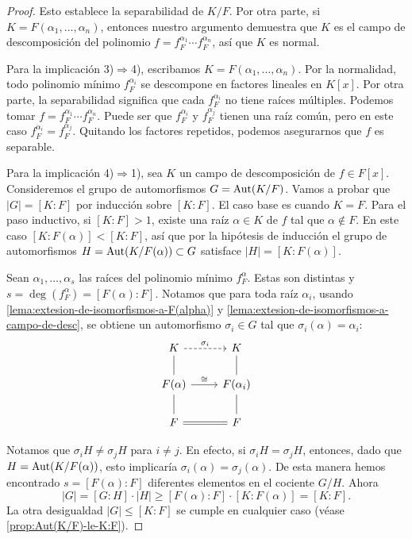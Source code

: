 \begin{proposicion-definicion}
\begin{proof}
    Esto establece la separabilidad de $K/F$. Por otra parte, si
    $K = F (\alpha_1,\ldots,\alpha_n)$, entonces nuestro argumento demuestra que
    $K$ es el campo de descomposición del polinomio
    $f = f^{\alpha_1}_F\cdots f^{\alpha_n}_F$, así que $K$ es normal.

    \vspace{1em}

    Para la implicación 3)$\Rightarrow$4), escribamos
    $K = F (\alpha_1,\ldots,\alpha_n)$. Por la normalidad, todo polinomio mínimo
    $f^{\alpha_i}_F$ se descompone en factores lineales en $K [x]$. Por otra parte,
    la separabilidad significa que cada $f^{\alpha_i}_F$ no tiene raíces
    múltiples. Podemos tomar $f = f^{\alpha_1}_F\cdots f^{\alpha_n}_F$. Puede ser que
    $f^{\alpha_i}_F$ y $f^{\alpha_j}_F$ tienen una raíz común, pero en este caso
    $f^{\alpha_i}_F = f^{\alpha_j}_F$. Quitando los factores repetidos, podemos
    asegurarnos que $f$ es separable.

    \vspace{1em}

    Para la implicación 4)$\Rightarrow$1), sea $K$ un campo de descomposición de
    $f \in F[x]$. Consideremos el grupo de automorfismos $G = \operatorname{Aut} (K/F)$. Vamos
    a probar que $|G| = [K : F]$ por inducción sobre $[K : F]$. El caso base
    es cuando $K = F$. Para el paso inductivo, si $[K : F] > 1$, existe una raíz
    $\alpha \in K$ de $f$ tal que $\alpha \notin F$.  En este caso
    $[K : F (\alpha)] < [K : F]$, así que por la hipótesis de inducción el grupo
    de automorfismos $H = \operatorname{Aut} (K/F (\alpha)) \subset G$ satisface
    $|H| = [K : F (\alpha)]$.

    Sean $\alpha_1, \ldots, \alpha_s$ las raíces del polinomio mínimo
    $f^\alpha_F$. Estas son distintas y $s = \deg (f^\alpha_F) = [F (\alpha) : F]$.
    Notamos que para toda raíz $\alpha_i$, usando
    \ref{lema:extesion-de-isomorfismos-a-F(alpha)} y
    \ref{lema:extesion-de-isomorfismos-a-campo-de-desc}, se obtiene un
    automorfismo $\sigma_i \in G$ tal que $\sigma_i (\alpha) = \alpha_i$:
    \[ \begin{tikzcd}
      K\ar[-]{d} \ar[dashed]{r}{\sigma_i} & K\ar[-]{d} \\
      F (\alpha)\ar[-]{d} \ar{r}{\cong} & F (\alpha_i)\ar[-]{d} \\
      F \ar[equals]{r} & F
    \end{tikzcd} \]

    Notamos que $\sigma_i H \ne \sigma_j H$ para $i \ne j$. En efecto,
    si $\sigma_i H = \sigma_j H$, entonces, dado que $H = \operatorname{Aut} (K/F(\alpha))$,
    esto implicaría $\sigma_i (\alpha) = \sigma_j (\alpha)$.
    De esta manera hemos encontrado $s = [F (\alpha) : F]$ diferentes
    elementos en el cociente $G/H$. Ahora
    $$|G| = [G : H]\cdot |H| \ge [F (\alpha) : F]\cdot [K : F (\alpha)] = [K : F].$$
    La otra desigualdad $|G| \le [K : F]$ se cumple en cualquier caso
    (véase \ref{prop:Aut(K/F)-le-K:F}).
  \end{proof}
\end{proposicion-definicion}

